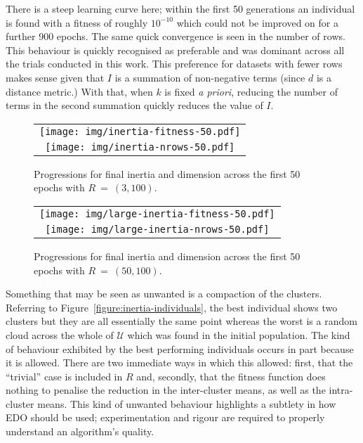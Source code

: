 There is a steep learning curve here; within the first 50 generations an
individual is found with a fitness of roughly \(10^{-10}\) which could not be
improved on for a further 900 epochs. The same quick convergence is seen in the
number of rows. This behaviour is quickly recognised as preferable and was
dominant across all the trials conducted in this work. This preference for
datasets with fewer rows makes sense given that \(I\) is a summation of
non-negative terms (since \(d\) is a distance metric.) With that, when \(k\) is
fixed \textit{a priori}, reducing the number of terms in the second summation
quickly reduces the value of \(I\). 

\begin{figure}[htbp]
    \ContinuedFloat*
    \centering
    \begin{tabular}{c}
        \texttt{[image: img/inertia-fitness-50.pdf]}\\
        \texttt{[image: img/inertia-nrows-50.pdf]}
    \end{tabular}
    \caption{%
        \label{figure:inertia-50}
        Progressions for final inertia and dimension across the first 50
        epochs with \(R~=~(3,100)\).
    }
\end{figure}

\begin{figure}[htbp]
    \ContinuedFloat%
    \centering
    \begin{tabular}{c}
        \texttt{[image: img/large-inertia-fitness-50.pdf]}\\
        \texttt{[image: img/large-inertia-nrows-50.pdf]}
    \end{tabular}
    \caption{%
        \label{figure:large-inertia-50}
        Progressions for final inertia and dimension across the first 50 epochs
        with \(R~=~(50,100)\).
    }
\end{figure}

Something that may be seen as unwanted is a compaction of the clusters.
Referring to Figure~\ref{figure:inertia-individuals}, the best individual shows
two clusters but they are all essentially the same point whereas the worst is a
random cloud across the whole of \(\mathcal{U}\) which was found in the
initial population. The kind of behaviour exhibited by the best performing
individuals occurs in part because it is allowed. There are two immediate ways
in which this allowed: first, that the ``trivial'' case is included in \(R\)
and, secondly, that the fitness function does nothing to penalise the reduction
in the inter-cluster means, as well as the intra-cluster means. This kind of
unwanted behaviour highlights a subtlety in how EDO should be used;
experimentation and rigour are required to properly understand an algorithm's
quality.

